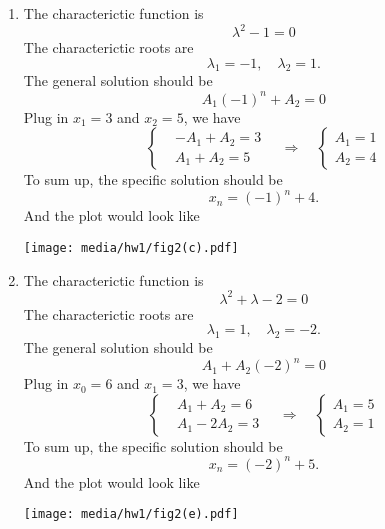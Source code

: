 \documentclass[
    classnum=MATH564,
    classname=MATHEMATICAL\ MODELING,
    due=January\ 28\,\ 2020,
    author=Gabrielle\ Streeter\qquad Hannah\ Wu\qquad\ Minghang\ Li,
    authorshort=Streeter\ \&\ Wu\ \&\ Li,
    teacher= Zachary\ M.\ Boyd,
    hw=1
]{hw-template}
\newenvironment{Figure}
  {\par\medskip\noindent\minipage{\linewidth}}
  {\endminipage\par\medskip}
\begin{document}
\begin{homeworkProblem}
\begin{enumerate}
    \item The characterictic function is \[
        \lambda^2 - 1 = 0
    \]
    The characterictic roots are \[
        \lambda_1 = -1, \quad \lambda_2 = 1.
    \]
    The general solution should be \[
        A_1 (-1)^n + A_2  = 0
    \]
    Plug in $x_1 = 3$ and $x_2 = 5$, we have \[
        \left\{
        \begin{aligned}
            &-A_1 + A_2  = 3\\
            &A_1  + A_2 = 5
        \end{aligned}
        \right.
        \quad
        \Rightarrow
        \quad
        \left\{
        \begin{aligned}
            A_1 = 1\\
            A_2 = 4
        \end{aligned}
        \right.
    \]
    To sum up, the specific solution should be $$
        x_n = (-1)^n + 4.
    $$
    And the plot would look like
    \begin{Figure}
        \centering
        \texttt{[image: media/hw1/fig2(c).pdf]}
    \end{Figure}
    \addtocounter{enumi}{1}
\pagebreak
    \item The characterictic function is \[
        \lambda^2 + \lambda -2 = 0
    \]
    The characterictic roots are \[
        \lambda_1 = 1, \quad \lambda_2 = -2.
    \]
    The general solution should be \[
        A_1 + A_2 (-2)^n = 0
    \]
    Plug in $x_0 = 6$ and $x_1 = 3$, we have \[
        \left\{
        \begin{aligned}
            &A_1 + A_2  = 6\\
            &A_1 - 2A_2 = 3
        \end{aligned}
        \right.
        \quad
        \Rightarrow
        \quad
        \left\{
        \begin{aligned}
            A_1 = 5\\
            A_2 = 1
        \end{aligned}
        \right.
    \]
    To sum up, the specific solution should be $$
        x_n = (-2)^n + 5.
    $$
    And the plot would look like
    \begin{Figure}
        \centering
        \texttt{[image: media/hw1/fig2(e).pdf]}
    \end{Figure}
\end{enumerate}

\end{homeworkProblem}
\end{document}
